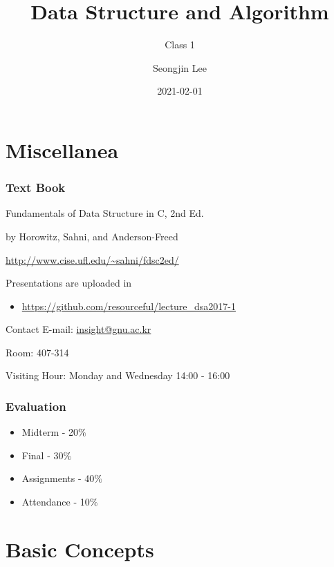 \documentclass[newPxFont,sthlmFooter,nooffset]{beamer}
\title{Data Structure and Algorithm}
\subtitle{Class 1}
\author[SJL]{Seongjin Lee}
\institute{\href{mailto:insight@gnu.ac.kr}{insight@gnu.ac.kr}\\\url{http://resourceful.github.io}\\Systems Research Lab.\\GNU}
\date{2021-02-01}
\begin{document}
\frame[plain,t]{\titlepage} 



\section{Miscellanea} %



\begin{frame}[t]
  \frametitle{Text Book}
Fundamentals of Data Structure in C, 2nd Ed.

by Horowitz, Sahni, and Anderson-Freed


\url{http://www.cise.ufl.edu/~sahni/fdsc2ed/}

Presentations are uploaded in 
\begin{itemize}
\item \url{https://github.com/resourceful/lecture_dsa2017-1}
\end{itemize}
\end{frame}

\begin{frame}[t]{Contact}
E-mail: \url{insight@gnu.ac.kr}

Room: 407-314

Visiting Hour: Monday and Wednesday 14:00 - 16:00

\end{frame}

\begin{frame}[t]
  \frametitle{Evaluation}
  \begin{itemize}
  \item Midterm - 20$\%$
  \item Final - 30$\%$
  \item Assignments - 40$\%$ 
  \item Attendance - 10$\%$
  \end{itemize}
\end{frame}


\section{Basic Concepts}
\end{document}
